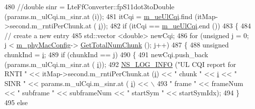\begin{DoxyCode}
480                                 \textcolor{comment}{//double sinr = LteFfConverter::fpS11dot3toDouble (params.m\_ulCqi.m\_sinr.at
       (i));}
481                                 itCqi = \hyperlink{classns3_1_1MmWaveFlexTtiPfMacScheduler_a16923ad9de133d3dc54aa5cd0e524b31}{m\_ueUlCqi}.find (itMap->second.m\_rntiPerChunk.at (
      \hyperlink{bernuolliDistribution_8m_a6f6ccfcf58b31cb6412107d9d5281426}{i}));
482                                 \textcolor{keywordflow}{if} (itCqi == \hyperlink{classns3_1_1MmWaveFlexTtiPfMacScheduler_a16923ad9de133d3dc54aa5cd0e524b31}{m\_ueUlCqi}.end ())
483                                 \{
484                                         \textcolor{comment}{// create a new entry}
485                                         std::vector <double> newCqi;
486                                         \textcolor{keywordflow}{for} (\textcolor{keywordtype}{unsigned} j = 0; j < \hyperlink{classns3_1_1MmWaveMacScheduler_a24d7af4971d2e500fe543cefbafa2fd9}{m\_phyMacConfig}->
      \hyperlink{classns3_1_1MmWavePhyMacCommon_a97e82c809a351fea9d5058ac1bb4c3c6}{GetTotalNumChunk} (); j++)
487                                         \{
488                                                 \textcolor{keywordtype}{unsigned} chunkInd = \hyperlink{bernuolliDistribution_8m_a6f6ccfcf58b31cb6412107d9d5281426}{i};
489                                                 \textcolor{keywordflow}{if} (chunkInd == j)
490                                                 \{
491                                                         newCqi.push\_back (params.m\_ulCqi.m\_sinr.at (
      \hyperlink{bernuolliDistribution_8m_a6f6ccfcf58b31cb6412107d9d5281426}{i}));
492                                                         \hyperlink{group__logging_gafbd73ee2cf9f26b319f49086d8e860fb}{NS\_LOG\_INFO} (\textcolor{stringliteral}{"UL CQI report for RNTI "} 
      << itMap->second.m\_rntiPerChunk.at (\hyperlink{bernuolliDistribution_8m_a6f6ccfcf58b31cb6412107d9d5281426}{i}) << \textcolor{stringliteral}{" chunk "} << \hyperlink{bernuolliDistribution_8m_a6f6ccfcf58b31cb6412107d9d5281426}{i} << \textcolor{stringliteral}{" SINR "} << params.m\_ulCqi.m\_sinr.at (
      \hyperlink{bernuolliDistribution_8m_a6f6ccfcf58b31cb6412107d9d5281426}{i}) << \(\backslash\)
493                                                                      \textcolor{stringliteral}{" frame "} << frameNum << \textcolor{stringliteral}{" subframe "} 
      << subframeNum << \textcolor{stringliteral}{" startSym "} << startSymIdx);
494                                                 \}
495                                                 \textcolor{keywordflow}{else}

\end{DoxyCode}
